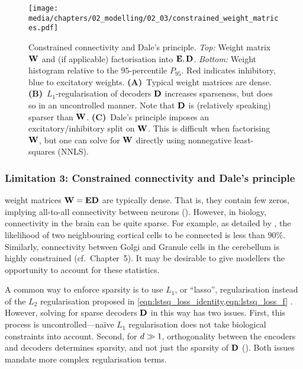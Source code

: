 \begin{figure}
	\texttt{[image: media/chapters/02\_modelling/02\_03/constrained\_weight\_matrices.pdf]}
	{\label{fig:sparsity_and_dales_principle_a}}%
	{\label{fig:sparsity_and_dales_principle_b}}%
	{\label{fig:sparsity_and_dales_principle_c}}%
	\caption[Constrained connectivity and Dale's principle]{Constrained connectivity and Dale's principle. \emph{Top:} Weight matrix $\mathbf{W}$ and (if applicable) factorisation into $\mathbf{E}, \mathbf{D}$. \emph{Bottom:} Weight histogram relative to the $95$-percentile $P_{95}$. Red indicates inhibitory, blue to excitatory weights. \textbf{(A)}~Typical \NEF weight matrices are dense.
	\textbf{(B)}~$L_1$-regularisation of decoders $\mathbf{D}$ increases sparseness, but does so in an uncontrolled manner. Note that $\mathbf{D}$ is (relatively speaking) sparser than $\mathbf{W}$.
	\textbf{(C)}~Dale's principle imposes an excitatory/inhibitory split on $\mathbf{W}$.
	This is difficult when factorising $\mathbf{W}$, but one can solve for $\mathbf{W}$ directly using nonnegative least-squares (NNLS).
	}
	\label{fig:sparsity_and_dales_principle}
\end{figure}

\subsubsection{Limitation 3: Constrained connectivity and Dale's principle}
\NEF weight matrices $\mathbf{W} = \mathbf{E} \mathbf{D}$ are typically dense.
That is, they contain few zeros, implying all-to-all connectivity between neurons ().
However, in biology, connectivity in the brain can be quite sparse.
For example, as detailed by \citet[Chapter~20]{braitenberg1998cortex}, the likelihood of two neighbouring cortical cells to be connected is less than $90\%$. Similarly, connectivity between Golgi and Granule cells in the cerebellum is highly constrained (cf.~Chapter~5).
It may be desirable to give modellers the opportunity to account for these statistics.

A common way to enforce sparsity is to use $L_1$, or \enquote{lasso}, regularisation instead of the $L_2$ regularisation proposed in \cref{eqn:lstsq_loss_identity,eqn:lstsq_loss_f} \citep[Chapter~6]{boyd2004convex}.
However, solving for sparse decoders $\mathbf{D}$ in this way has two issues.
First, this process is uncontrolled---na\"ive $L_1$ regularisation does not take biological constraints into account.
Second, for $d \gg 1$, orthogonality between the encoders and decoders determines sparsity, and not just the sparsity of $\mathbf{D}$ ().
Both issues mandate more complex regularisation terms.

